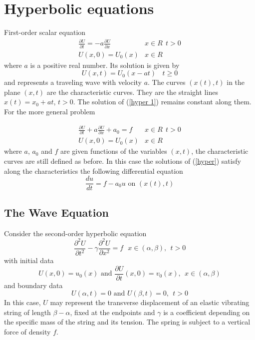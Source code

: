 \chapter{Hyperbolic equations}
First-order scalar equation
\begin{equation}
\label{hyper 1}
\begin{array}{cc}
\frac{\partial U}{\partial t} =-a\frac{\partial U}{\partial x}
& x \in R \ \ t >0\\
U(x,0)= U_0(x) & x \in R\end{array} \end{equation}
where $a$ is a positive real number. Its solution is given by
\[U(x,t) = U_0(x-at) \ \ \ \ t \geq 0 \] 
and represents a traveling wave with velocity $a$. The curves $(x(t),t)$ in 
the plane $(x,t)$ are the characteristic curves. They are the straight lines 
$x(t)=x_0+at$, $t >0$.
The solution of (\ref{hyper 1}) remains constant along them.\\
For the more general problem 
 
\begin{equation}
\label{hyper}
\begin{array}{cc}
\frac{\partial U}{\partial t}+ a\frac{\partial U}{\partial x}+a_0 = f 
& x \in R \ \ t >0\\
U(x,0)= U_0(x) & x \in R\end{array} \end{equation}
where 
$a$, $a_0$ and $f$ are given functions of the variables $(x,t)$, the characteristic
curves are still defined as before. In this case the solutions of (\ref{hyper})
satisfy along the characteristics the following differential equation
\[\frac{du}{dt}=f-a_0u \mbox{ on } (x(t),t) \]

\section{The Wave Equation}
Consider the second-order hyperbolic equation
\begin{equation}
\label{wave}
\frac{\partial^2 U}{\partial t^2} - \gamma \frac{\partial^2 U}{\partial x^2}=f \ \ \ x \in (\alpha,\beta), \ \ t>0\end{equation}
with initial data
\[U(x,0) = u_0(x) \mbox{   and   } \frac{\partial U}{\partial t}(x,0)=v_0(x), \ \ x\in (\alpha,\beta) \]
and boundary data
\[U(\alpha,t) = 0 \mbox{   and   } U(\beta,t)=0, \ \ t>0 \]
In this case, $U$ may represent the transverse displacement of an elastic vibrating 
string of length $\beta-\alpha$, fixed at the endpoints and $\gamma$ is a coefficient
depending on the specific mass of the string and its tension. The spring is subject to a vertical force of density $f$.\\

